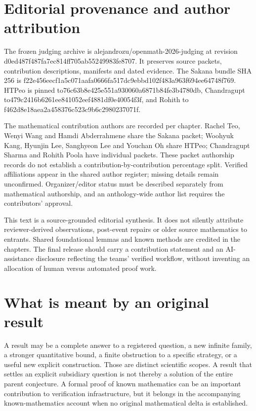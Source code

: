\documentclass[11pt,a4paper]{article}
\begin{document}
\section{Editorial provenance and author attribution}
The frozen judging archive is alejandrozu/openmath-2026-judging at revision d0ed487f487fa7ec814ff705ab55249983fe8707. It preserves source packets, contribution descriptions, manifests and dated evidence. The Sakana bundle SHA 256 is f22e456eecf1a5c071aafa0666fa517dc9ebbd102f483a963f694ee64748f769. HTPeo is pinned to76c63b8e425e551a930060a6871b84fe3b4780db, Chandragupt to479c2416b6261ee841052eef4881df0e40054f3f, and Rohith to f462d8e18aea2a458376c523c9b6c2980237071f.

The mathematical contribution authors are recorded per chapter. Rachel Teo, Wenyi Wang and Hamdi Abderrahmene share the Sakana packet; Woohyuk Kang, Hyunjin Lee, Sanghyeon Lee and Youchan Oh share HTPeo; Chandragupt Sharma and Rohith Poola have individual packets. These packet authorship records do not establish a contribution-by-contribution percentage split. Verified affiliations appear in the shared author register; missing details remain unconfirmed. Organizer/editor status must be described separately from mathematical authorship, and an anthology-wide author list requires the contributors' approval.

This text is a source-grounded editorial synthesis. It does not silently attribute reviewer-derived observations, post-event repairs or older source mathematics to entrants. Shared foundational lemmas and known methods are credited in the chapters. The final release should carry a contribution statement and an AI-assistance disclosure reflecting the teams' verified workflow, without inventing an allocation of human versus automated proof work.

\section{What is meant by an original result}
A result may be a complete answer to a registered question, a new infinite family, a stronger quantitative bound, a finite obstruction to a specific strategy, or a useful new explicit construction. Those are distinct scientific scopes. A result that settles an explicit subsidiary question is not thereby a solution of the entire parent conjecture. A formal proof of known mathematics can be an important contribution to verification infrastructure, but it belongs in the accompanying known-mathematics account when no original mathematical delta is established.
\end{document}
